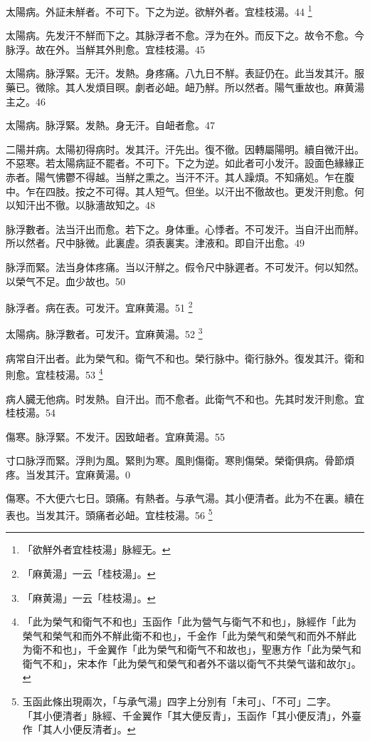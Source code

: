 \documentclass[12pt,twoside,UTF8,b5paper]{ctexbook}
\begin{document}
太陽病。外証未觧者。不可下。下之为逆。欲觧外者。宜桂枝湯。44
	\footnote{「欲觧外者宜桂枝湯」脉經无。}

太陽病。先发汗不觧而下之。其脉浮者不愈。浮为在外。而反下之。故令不愈。今脉浮。故在外。当觧其外則愈。宜桂枝湯。45

太陽病。脉浮緊。无汗。发熱。身疼痛。八九日不觧。表証仍在。此当发其汗。服藥已。微除。其人发煩目暝。劇者必衄。衄乃觧。所以然者。陽气重故也。麻黄湯主之。46

太陽病。脉浮緊。发熱。身无汗。自衄者愈。47

二陽并病。太陽初得病时。发其汗。汗先出{。復}不徹。因轉屬陽明。續自微汗出。不惡寒。若太陽病証不罷者。不可下。下之为逆。如此者可小发汗。設面色緣緣正赤者。陽气怫鬱不得越。当觧之熏之。当汗不汗。其人躁煩。不知痛処。乍在腹中。乍在四肢。按之不可得。其人短气。但坐。以汗出不徹故也。更发汗則愈。何以知汗出不徹。以脉濇故知之。48

脉浮數者。法当汗出而愈。若下之。身体重。心悸者。不可发汗。当自汗出而觧。所以然者。尺中脉微。此裏虗。須表裏実。津液和。即自汗出愈。49

脉浮而緊。法当身体疼痛。当以汗觧之。假令尺中脉遲者。不可发汗。何以知然。以榮气不足。血少故也。50

脉浮者。病在表。可发汗。宜麻黄湯。51
	\footnote{「麻黄湯」一云「桂枝湯」。}

{太陽病。}脉浮數者。可发汗。宜麻黄湯。52
	\footnote{「麻黄湯」一云「桂枝湯」。}

病常自汗出者。此为榮气和。衛气不和也。榮行脉中。衛行脉外。復发其汗。衛和則愈。宜桂枝湯。53
	\footnote{「此为榮气和衛气不和也」玉函作「此为營气与衛气不和也」，脉經作「此为榮气和榮气和而外不觧此衛不和也」，千金作「此为榮气和榮气和而外不觧此为衛不和也」，千金翼作「此为榮气和衛气不和故也」，聖惠方作「此为榮气和衛气不和」，宋本作「此为榮气和榮气和者外不谐以衛气不共榮气谐和故尔」。}

病人臓无他病。时发熱。自汗出。而不愈者。此衛气不和也。先其时发汗則愈。宜桂枝湯。54

傷寒。脉浮緊。不发汗。因致衄者。宜麻黄湯。55

{寸口}脉浮而緊。浮則为風。緊則为寒。風則傷衛。寒則傷榮。榮衛俱病。骨節煩疼。当发其汗。宜麻黄湯。0

傷寒。不大便六七日。頭痛。有熱者。与承气湯。其小便清者。此为不在裏。續在表也。当发其汗。頭痛者必衄。宜桂枝湯。56
	\footnote{玉函此條出現兩次，「与承气湯」四字上分別有「未可」、「不可」二字。\\「其小便清者」脉經、千金翼作「其大便反青」，玉函作「其小便反清」，外臺作「其人小便反清者」。}
\end{document}
